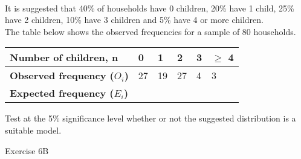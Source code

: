 \documentclass[fleqn]{article}
\begin{document}
\begin{examplebox}{}{}
    \\ %
    It is suggested that 40\% of households have 0 children, 20\% have 1 child, 25\% have 2 children, 10\% have 3 children and 5\% have 4 or more children. \vspace{2mm}\\
    The table below shows the observed frequencies for a sample of 80 households.
    
    \begin{center}
        \begin{minipage}[t]{0.9\linewidth}
            \begin{tabularx}{\textwidth}{|X|*5{P{16mm}|}}
                \hline
                \textbf{Number of children, n}      & 0  & 1  & 2  & 3 & $\geq$ 4 \\\hline
                \textbf{Observed frequency ($O_i$)} & 27 & 19 & 27 & 4 & 3        \\\hline
                \textbf{Expected frequency ($E_i$)} &    &    &    &   &          \\\hline
            \end{tabularx}
            \vspace{4mm}
        \end{minipage}
    \end{center}
    
    Test at the 5\% significance level whether or not the suggested distribution is a suitable model.
\end{examplebox}
\vfill
\begin{practice*}{Exercise 6B}{}
\end{practice*}
\newpage



\end{document}
